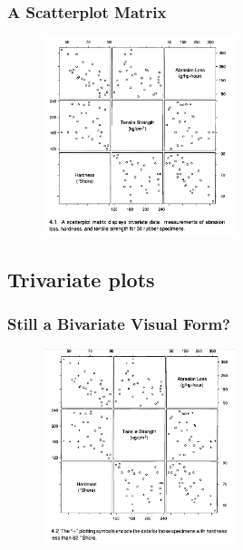 \documentclass[aspectratio=1610]{beamer}
\begin{document}
\begin{frame}
	\frametitle{A Scatterplot Matrix}
	\begin{figure}
		\begin{center}
			\includegraphics[width=0.5\textwidth]{figures/scatterplot_matrix.png}
		\end{center}
	\end{figure}
\end{frame}


\subsection{Trivariate plots}

\begin{frame}
	\frametitle{Still a Bivariate Visual Form?}
	\begin{figure}
		\begin{center}
			\includegraphics[width=0.5\textwidth]{figures/trivariate_scatterplot_matrix.png}
		\end{center}
	\end{figure}
\end{frame}
\end{document}
